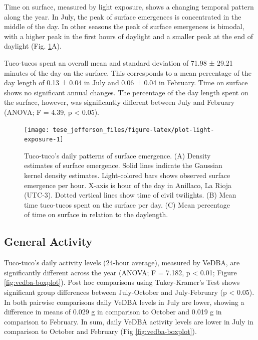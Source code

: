\documentclass[english,msc,numbers,hidelinks]{coppe}
\begin{document}
  Time on surface, measured by light exposure, shows a changing temporal pattern along the year. In July, the peak of surface emergences is concentrated in the middle of the day. In other seasons the peak of surface emergences is bimodal, with a higher peak in the first hours of daylight and a smaller peak at the end of daylight (Fig. \ref{fig:plot-light-exposure}A).

  Tuco-tucos spent an overall mean and standard deviation of 71.98 ± 29.21 minutes of the day on the surface. This corresponds to a mean percentage of the day length of 0.13 ± 0.04 in July and 0.06 ± 0.04 in February. Time on surface shows no significant annual changes. The percentage of the day length spent on the surface, however, was significantly different between July and February (ANOVA; F = 4.39, p \textless{} 0.05). \newline
  \begin{figure}[H]

  {\centering \texttt{[image: tese\_jefferson\_files/figure-latex/plot-light-exposure-1]} 

  }

  \caption{Tuco-tuco's daily patterns of surface emergence. (A) Density estimates of surface emergence. Solid lines indicate the Gaussian kernel density estimates. Light-colored bars shows observed surface emergence per hour. X-axis is hour of the day in Anillaco, La Rioja (UTC-3). Dotted vertical lines show time of civil twilights. (B) Mean time tuco-tucos spent on the surface per day. (C) Mean percentage of time on surface in relation to the daylength.}\label{fig:plot-light-exposure}
  \end{figure}
  \clearpage

  \hypertarget{general-activity}{%
  \subsection{General Activity}\label{general-activity}}

  Tuco-tuco's daily activity levels (24-hour average), measured by VeDBA, are significantly different across the year (ANOVA; F = 7.182, p \textless{} 0.01; Figure \ref{fig:vedba-boxplot}). Post hoc comparisons using Tukey-Kramer's Test shows significant group differences between July-October and July-February (p \textless{} 0.05). In both pairwise comparisons daily VeDBA levels in July are lower, showing a difference in means of 0.029 g in comparison to October and 0.019 g in comparison to February. In sum, daily VeDBA activity levels are lower in July in comparison to October and February (Fig \ref{fig:vedba-boxplot}).
\end{document}
